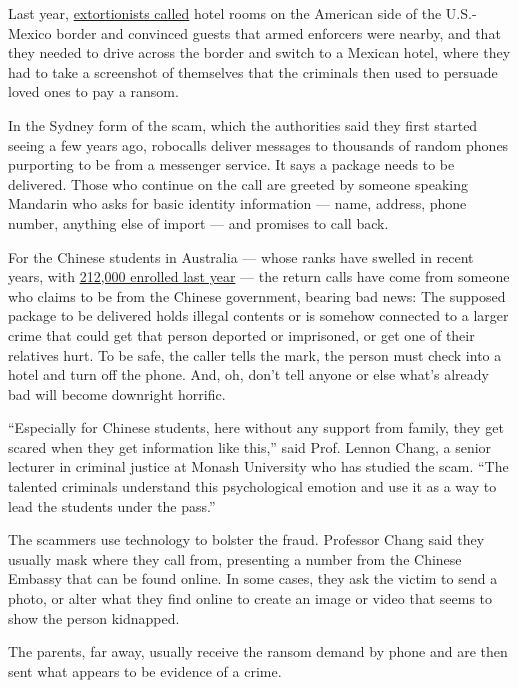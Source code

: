 Last year,
\href{https://www.fbi.gov/contact-us/field-offices/phoenix/news/press-releases/fbi-law-enforcement-partners-warn-of-new-twist-in-virtual-kidnapping-scams}{extortionists
called} hotel rooms on the American side of the U.S.-Mexico border and
convinced guests that armed enforcers were nearby, and that they needed
to drive across the border and switch to a Mexican hotel, where they had
to take a screenshot of themselves that the criminals then used to
persuade loved ones to pay a ransom.

In the Sydney form of the scam, which the authorities said they first
started seeing a few years ago, robocalls deliver messages to thousands
of random phones purporting to be from a messenger service. It says a
package needs to be delivered. Those who continue on the call are
greeted by someone speaking Mandarin who asks for basic identity
information --- name, address, phone number, anything else of import ---
and promises to call back.

For the Chinese students in Australia --- whose ranks have swelled in
recent years, with
\href{https://internationaleducation.gov.au/research/DataVisualisations/Pages/Student-number.aspx}{212,000
enrolled last year} --- the return calls have come from someone who
claims to be from the Chinese government, bearing bad news: The supposed
package to be delivered holds illegal contents or is somehow connected
to a larger crime that could get that person deported or imprisoned, or
get one of their relatives hurt. To be safe, the caller tells the mark,
the person must check into a hotel and turn off the phone. And, oh,
don't tell anyone or else what's already bad will become downright
horrific.

``Especially for Chinese students, here without any support from family,
they get scared when they get information like this,'' said Prof. Lennon
Chang, a senior lecturer in criminal justice at Monash University who
has studied the scam. ``The talented criminals understand this
psychological emotion and use it as a way to lead the students under the
pass.''

The scammers use technology to bolster the fraud. Professor Chang said
they usually mask where they call from, presenting a number from the
Chinese Embassy that can be found online. In some cases, they ask the
victim to send a photo, or alter what they find online to create an
image or video that seems to show the person kidnapped.

The parents, far away, usually receive the ransom demand by phone and
are then sent what appears to be evidence of a crime.

